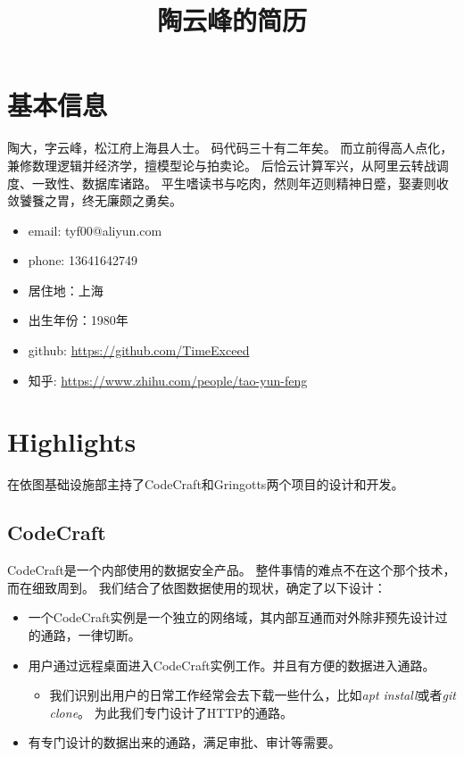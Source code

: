 \documentclass[scheme=plain]{ctexart}
\title{陶云峰的简历}
\begin{document}
\maketitle

\section{基本信息}

陶大，字云峰，松江府上海县人士。
码代码三十有二年矣。
而立前得高人点化，兼修数理逻辑并经济学，擅模型论与拍卖论。
后恰云计算军兴，从阿里云转战调度、一致性、数据库诸路。
平生嗜读书与吃肉，然则年迈则精神日蹙，娶妻则收敛饕餮之胃，终无廉颇之勇矣。

\begin{itemize}
    \item email: tyf00@aliyun.com
    \item phone: 13641642749
    \item 居住地：上海
    \item 出生年份：1980年
    \item github: \url{https://github.com/TimeExceed}
    \item 知乎: \url{https://www.zhihu.com/people/tao-yun-feng}
\end{itemize}

\section{Highlights}

在依图基础设施部主持了CodeCraft和Gringotts两个项目的设计和开发。

\subsection*{CodeCraft}

CodeCraft是一个内部使用的数据安全产品。
整件事情的难点不在这个那个技术，而在细致周到。
我们结合了依图数据使用的现状，确定了以下设计：
\begin{itemize}
    \item 一个CodeCraft实例是一个独立的网络域，其内部互通而对外除非预先设计过的通路，一律切断。
    \item 用户通过远程桌面进入CodeCraft实例工作。并且有方便的数据进入通路。
        \begin{itemize}
            \item 我们识别出用户的日常工作经常会去下载一些什么，比如\textsl{apt install}或者\textsl{git clone}。
                为此我们专门设计了HTTP的通路。
        \end{itemize}
    \item 有专门设计的数据出来的通路，满足审批、审计等需要。
\end{itemize}
\end{document}
